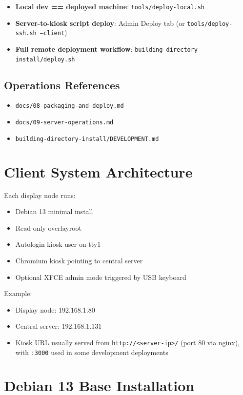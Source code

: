 \documentclass[11pt,letterpaper]{article}
\begin{document}
\begin{itemize}
\item \textbf{Local dev == deployed machine}: \texttt{tools/deploy-local.sh}
\item \textbf{Server-to-kiosk script deploy}: Admin Deploy tab (or \texttt{tools/deploy-ssh.sh --client})
\item \textbf{Full remote deployment workflow}: \texttt{building-directory-install/deploy.sh}
\end{itemize}

\subsection{Operations References}

\begin{itemize}
\item \texttt{docs/08-packaging-and-deploy.md}
\item \texttt{docs/09-server-operations.md}
\item \texttt{building-directory-install/DEVELOPMENT.md}
\end{itemize}

\section{Client System Architecture}

Each display node runs:

\begin{itemize}
\item Debian 13 minimal install
\item Read-only overlayroot
\item Autologin kiosk user on tty1
\item Chromium kiosk pointing to central server
\item Optional XFCE admin mode triggered by USB keyboard
\end{itemize}

Example:

\begin{itemize}
\item Display node: 192.168.1.80
\item Central server: 192.168.1.131
\item Kiosk URL usually served from \texttt{http://<server-ip>/} (port 80 via nginx), with \texttt{:3000} used in some development deployments
\end{itemize}

\section{Debian 13 Base Installation}
\end{document}
